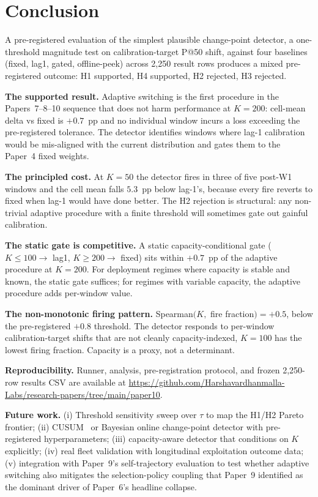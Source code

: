 \section{Conclusion}
\label{sec:conclusion}

A pre-registered evaluation of the simplest plausible change-point
detector, a one-threshold magnitude test on calibration-target
P@50 shift, against four baselines (fixed, lag1, gated,
offline-peek) across 2{,}250 result rows produces a mixed
pre-registered outcome: H1 supported, H4 supported, H2 rejected,
H3 rejected.

\textbf{The supported result.} Adaptive switching is the first
procedure in the Papers~7--8--10 sequence that does not harm
performance at $K = 200$: cell-mean delta vs fixed is $+0.7$~pp
and no individual window incurs a loss exceeding the pre-registered
tolerance. The detector identifies windows where lag-1 calibration
would be mis-aligned with the current distribution and gates them
to the Paper~4 fixed weights.

\textbf{The principled cost.} At $K = 50$ the detector fires in
three of five post-W1 windows and the cell mean falls $5.3$~pp
below lag-1's, because every fire reverts to fixed when lag-1
would have done better. The H2 rejection is structural: any
non-trivial adaptive procedure with a finite threshold will
sometimes gate out gainful calibration.

\textbf{The static gate is competitive.} A static
capacity-conditional gate ($K \leq 100 \to$ lag1, $K \geq 200 \to$
fixed) sits within $+0.7$~pp of the adaptive procedure at $K = 200$.
For deployment regimes where capacity is stable and known, the
static gate suffices; for regimes with variable capacity, the
adaptive procedure adds per-window value.

\textbf{The non-monotonic firing pattern.} Spearman$(K,$ fire
fraction$) = +0.5$, below the pre-registered $+0.8$ threshold. The
detector responds to per-window calibration-target shifts that are
not cleanly capacity-indexed, $K = 100$ has the lowest firing
fraction. Capacity is a proxy, not a determinant.

\textbf{Reproducibility.} Runner, analysis, pre-registration protocol,
and frozen 2{,}250-row results CSV are available at
\url{https://github.com/Harshavardhanmalla-Labs/research-papers/tree/main/paper10}.

\textbf{Future work.} (i) Threshold sensitivity sweep over $\tau$ to
map the H1/H2 Pareto frontier; (ii) CUSUM~\cite{page1954cusum} or
Bayesian online change-point detector with pre-registered
hyperparameters; (iii) capacity-aware detector that conditions on
$K$ explicitly; (iv) real fleet validation with longitudinal
exploitation outcome data; (v) integration with Paper~9's
self-trajectory evaluation to test whether adaptive switching also
mitigates the selection-policy coupling that Paper~9 identified as
the dominant driver of Paper~6's headline collapse.
